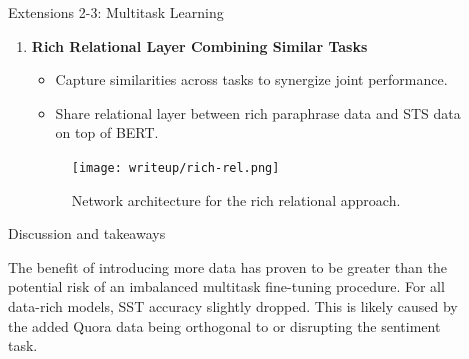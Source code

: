 \documentclass[final]{beamer}
\newlength{\sepwidth}
\newlength{\colwidth}
\newcommand{\separatorcolumn}{\begin{column}{\sepwidth}\end{column}}
\begin{document}
\begin{frame}[t]
\begin{columns}[t]
\begin{column}{\colwidth}
\begin{block}{Extensions 2-3: Multitask Learning}
\begin{enumerate}
      \item \textbf{Rich Relational Layer Combining Similar Tasks} 
      \begin{itemize}
      \normalsize
          \item Capture similarities across tasks to synergize joint performance.
          \item Share relational layer between rich paraphrase data and STS data on top of BERT.
      \end{itemize}  
      \begin{figure}[h]
    \centering
    \texttt{[image: writeup/rich-rel.png]}
    \caption{Network architecture for the rich relational approach.}
\end{figure}
    \end{enumerate}
  \end{block}
\vspace{-1.2cm}
  \begin{alertblock}{\small Discussion and takeaways}
  \begin{outline}
      \1  The benefit of introducing more data has proven to be greater than the potential risk of an imbalanced multitask fine-tuning procedure.
      \1  For all data-rich models, SST accuracy slightly dropped. This is likely caused by the added Quora data being orthogonal to or disrupting the sentiment task.

  \end{outline}
     
  \end{alertblock}
\end{column}

\separatorcolumn

\begin{column}{\colwidth}


\end{column}
\end{columns}
\end{frame}
\end{document}
